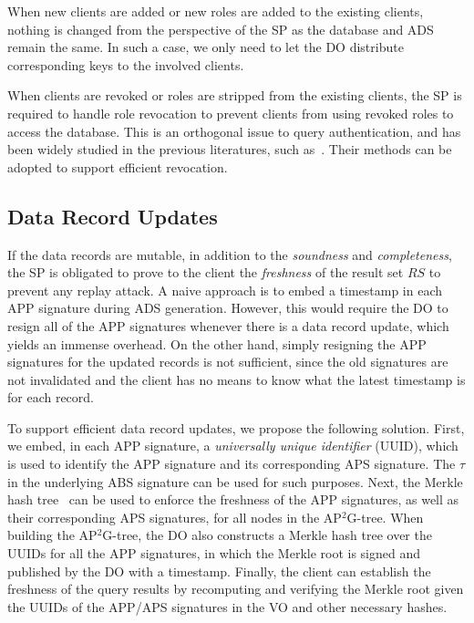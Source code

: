 When new clients are added or new roles are added to the existing clients, nothing is changed from the perspective of the SP as the database and ADS remain the same. In such a case, we only need to let the DO distribute corresponding keys to the involved clients.

When clients are revoked or roles are stripped from the existing clients, the SP is required to handle role revocation to prevent clients from using revoked roles to access the database.
This is an orthogonal issue to query authentication, and has been widely studied in the previous literatures, such as~\cite{10.1145/1755688.1755720,10.1145/2484313.2484383}. Their methods can be adopted to support efficient revocation.

\subsection{Data Record Updates}

If the data records are mutable, in addition to the \emph{soundness} and \emph{completeness}, the SP is obligated to prove to the client the \emph{freshness} of the result set $RS$ to prevent any replay attack.
A naive approach is to embed a timestamp in each APP signature during ADS generation. However, this would require the DO to resign all of the APP signatures whenever there is a data record update, which yields an immense overhead. On the other hand, simply resigning the APP signatures for the updated records is not sufficient, since the old signatures are not invalidated and the client has no means to know what the latest timestamp is for each record.

To support efficient data record updates, we propose the following solution. First, we embed, in each APP signature, a \emph{universally unique identifier} (UUID), which is used to identify the APP signature and its corresponding APS signature. The $\tau$ in the underlying ABS signature can be used for such purposes. Next, the Merkle hash tree~\cite{10.1007/0-387-34805-0_21} can be used to enforce the freshness of the APP signatures, as well as their corresponding APS signatures, for all nodes in the AP$^2$G-tree. When building the AP$^2$G-tree, the DO also constructs a Merkle hash tree over the UUIDs for all the APP signatures, in which the Merkle root is signed and published by the DO with a timestamp. Finally, the client can establish the freshness of the query results by recomputing and verifying the Merkle root given the UUIDs of the APP/APS signatures in the VO and other necessary hashes.

